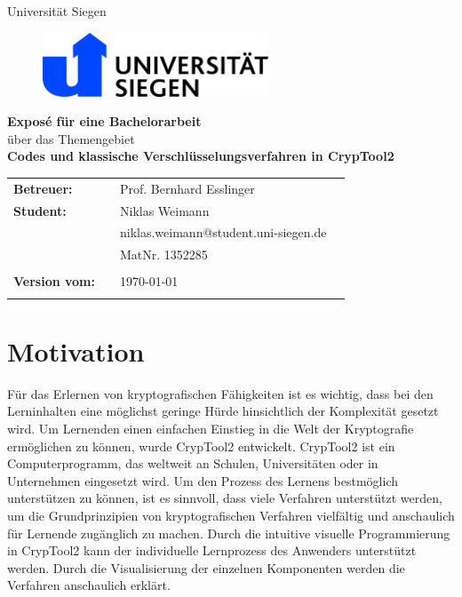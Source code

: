 \documentclass[fontsize=11pt, paper=a4, parskip=half]{scrartcl}
\begin{document}
\thispagestyle{empty}

\begin{center}
\Large{Universität Siegen}\\
\end{center}

\begin{figure}[t]
 \centering
 \includegraphics[width=0.6\textwidth]{images/uni-siegen.jpg}
\end{figure}

\vspace{2.5cm}
\begin{center}
\textbf{\LARGE{Exposé für eine Bachelorarbeit}}\\
\Large{über das Themengebiet}\\
\textbf{\LARGE{Codes und klassische Verschlüsselungsverfahren in CrypTool2}}\\
\end{center}
\vspace{6cm}
\begin{flushleft}
\begin{tabular}{llll}
\textbf{Betreuer:} & & Prof. Bernhard Esslinger  & \\
\textbf{Student:} & & Niklas Weimann & \\
& & niklas.weimann@student.uni-siegen.de & \\
& & MatNr. 1352285 & \\
& & \\
\textbf{Version vom:} & & \today &\\
& & \\
\end{tabular}
\end{flushleft}
\newpage

\tableofcontents
\newpage

\section{Motivation}
Für das Erlernen von kryptografischen Fähigkeiten ist es wichtig, dass bei den Lerninhalten eine möglichst geringe Hürde hinsichtlich der Komplexität gesetzt wird. Um Lernenden einen einfachen Einstieg in die Welt der Kryptografie ermöglichen zu können, wurde CrypTool2 entwickelt. CrypTool2 ist ein Computerprogramm, das weltweit an Schulen, Universitäten oder in Unternehmen eingesetzt wird. Um den Prozess des Lernens bestmöglich unterstützen zu können, ist es sinnvoll, dass viele Verfahren unterstützt werden, um die Grundprinzipien von kryptografischen Verfahren vielfältig und anschaulich für Lernende zugänglich zu machen. Durch die intuitive visuelle Programmierung in CrypTool2 kann der individuelle Lernprozess des Anwenders unterstützt werden. Durch die Visualisierung der einzelnen Komponenten werden die Verfahren anschaulich erklärt.
\end{document}
